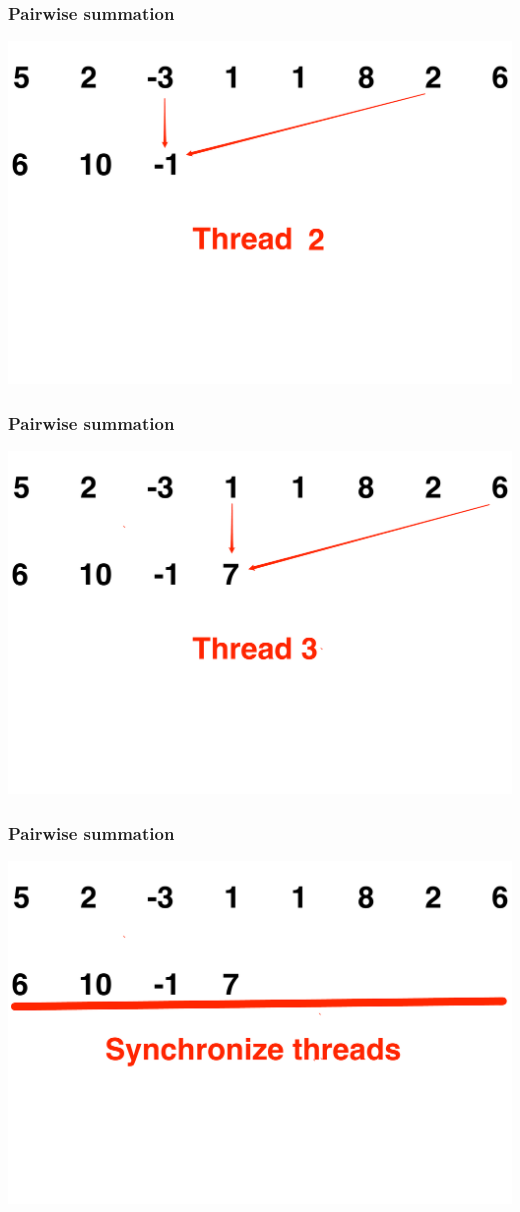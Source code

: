 \documentclass[handout]{beamer}
\numberwithin{equation}{section}
\begin{document}
\begin{frame}
\frametitle{Pairwise summation}
\includegraphics[scale=.15]{../../fig/psum3.pdf}
\end{frame}
{}
\begin{frame}
\frametitle{Pairwise summation}
\includegraphics[scale=.25]{../../fig/psum4.pdf}
\end{frame}

\begin{frame}
\frametitle{Pairwise summation}
\includegraphics[scale=.25]{../../fig/psum5.pdf}
\end{frame}
\end{document}
